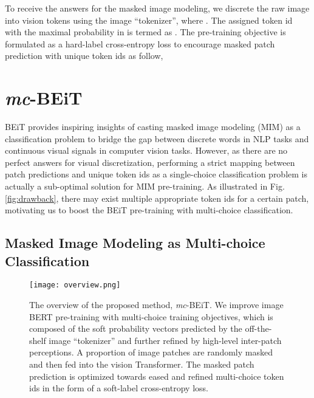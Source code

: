 \documentclass[runningheads]{llncs}
\begin{document}
To receive the answers for the masked image modeling, we discrete the raw image  into vision tokens  using the image ``tokenizer'', where .
The assigned token id with the maximal probability in  is termed as .
The pre-training objective is formulated as a hard-label cross-entropy loss to encourage masked patch prediction with unique token ids as follow,









\section{\emph{mc}-BEiT}

BEiT provides inspiring insights of casting masked image modeling (MIM) as a classification problem to bridge the gap between discrete words in NLP tasks and continuous visual signals in computer vision tasks.
However, as there are no perfect answers for visual discretization, performing a strict mapping between patch predictions and unique token ids as a single-choice classification problem is actually a sub-optimal solution for MIM pre-training.
As illustrated in Fig. \ref{fig:drawback}, there may exist multiple appropriate token ids for a certain patch, motivating us to boost the BEiT pre-training with multi-choice classification.




\subsection{Masked Image Modeling as Multi-choice Classification}

\begin{figure}[t]
\begin{center}
\texttt{[image: overview.png]}
\caption{The overview of the proposed method, \emph{mc}-BEiT. We improve image BERT pre-training with multi-choice training objectives,  which is composed of the soft probability vectors predicted by the off-the-shelf image “tokenizer”
and further refined by high-level inter-patch perceptions.
A proportion of image patches are randomly masked and then fed into the vision Transformer. The masked patch prediction is optimized towards eased and refined multi-choice token ids in the form of a soft-label cross-entropy loss. }
\label{fig:overview}
\end{center}
\end{figure}
\end{document}
